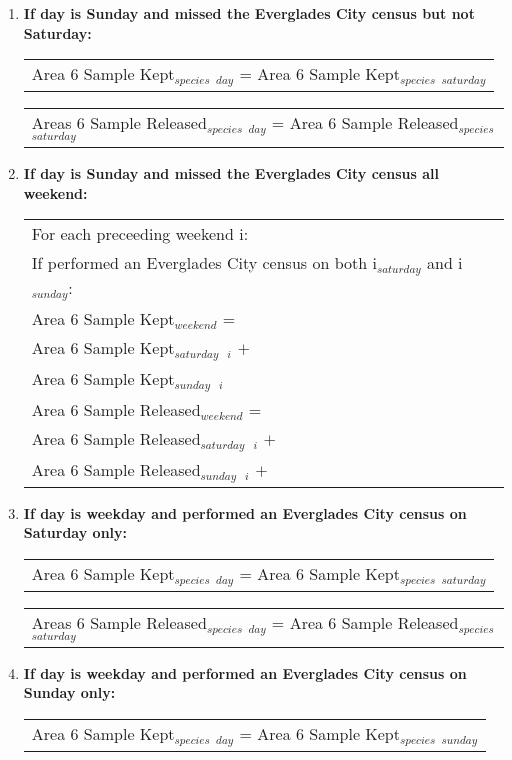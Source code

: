 \documentclass[letterpaper,12pt]{article}
\newcommand{\hspacer}{\hspace*{1cm}}
\begin{document}
\begin{enumerate}
\item
\textbf{If day is Sunday and missed the Everglades City census but not Saturday:} \\
\begin{tabular}{l@{ }}
	Area 6 Sample Kept$_{species}$ $_{day}$ =
		Area 6 Sample Kept$_{species}$ $_{saturday}$
\end{tabular}

\begin{tabular}{l@{ }}
	Areas 6 Sample Released$_{species}$ $_{day}$ =
		Area 6 Sample Released$_{species}$ $_{saturday}$
\end{tabular}

\item
\textbf{If day is Sunday and missed the Everglades City census all weekend:} \\
\begin{tabular}{l@{ }l@{ }l}
	For each preceeding weekend i: \\
\hspacer If performed an Everglades City census on both i$_{saturday}$ and i$_{sunday}$: \\
\hspacer \hspacer	Area 6 Sample Kept$_{weekend}$ = \\
\hspacer \hspacer \hspacer Area 6 Sample Kept$_{saturday}$\ $_{i}$ $+$ \\
\hspacer \hspacer \hspacer Area 6 Sample Kept$_{sunday}$\ $_{i}$ \\

\hspacer \hspacer	Area 6 Sample Released$_{weekend}$ = \\
\hspacer \hspacer \hspacer Area 6 Sample Released$_{saturday}$\ $_{i}$ $+$ \\
\hspacer \hspacer \hspacer Area 6 Sample Released$_{sunday}$\ $_{i}$ $+$
\end{tabular}

\item
\textbf{If day is weekday and performed an Everglades City census on Saturday only:} \\
\begin{tabular}{l@{ }}
	Area 6 Sample Kept$_{species}$ $_{day}$ =
		Area 6 Sample Kept$_{species}$ $_{saturday}$
\end{tabular}

\begin{tabular}{l@{ }}
	Areas 6 Sample Released$_{species}$ $_{day}$ =
		Area 6 Sample Released$_{species}$ $_{saturday}$
\end{tabular}

\item
\textbf{If day is weekday and performed an Everglades City census on Sunday only:} \\
\begin{tabular}{l@{ }}
	Area 6 Sample Kept$_{species}$ $_{day}$ =
		Area 6 Sample Kept$_{species}$ $_{sunday}$
\end{tabular}


\end{enumerate}
\end{document}
